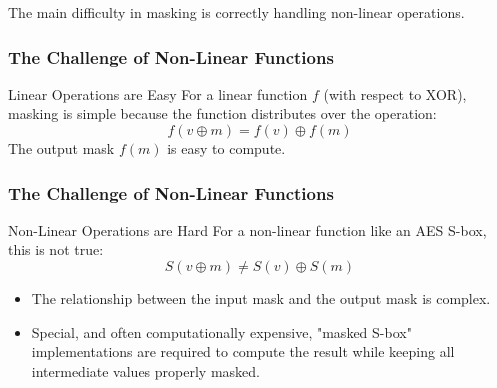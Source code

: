 \begin{frame}
    The main difficulty in masking is correctly handling non-linear operations.
    \frametitle{The Challenge of Non-Linear Functions}    
    \begin{block}{Linear Operations are Easy}
        For a linear function $f$ (with respect to XOR), masking is simple because the function distributes over the operation:
        \[ f(v \oplus m) = f(v) \oplus f(m) \]
        The output mask $f(m)$ is easy to compute.
    \end{block}
\end{frame}

\begin{frame}
    \frametitle{The Challenge of Non-Linear Functions}    

    \begin{block}{Non-Linear Operations are Hard}
        For a non-linear function like an AES S-box, this is not true:
        \[ S(v \oplus m) \neq S(v) \oplus S(m) \]
        \begin{itemize}
            \item The relationship between the input mask and the output mask is complex.
            \item Special, and often computationally expensive, "masked S-box" implementations are required to compute the result while keeping all intermediate values properly masked.
        \end{itemize}
    \end{block}

\end{frame}


